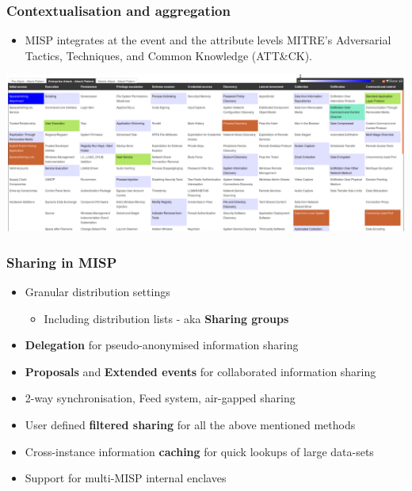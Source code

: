 \begin{frame}
        \frametitle{Contextualisation and aggregation}
        \begin{itemize}
                \item MISP integrates at the event and the attribute levels MITRE's Adversarial Tactics, Techniques, and Common Knowledge (ATT\&CK).
        \end{itemize}
        \includegraphics[scale=0.2]{screenshots/attack-screenshot.png}
\end{frame}

\begin{frame}
\frametitle{Sharing in MISP}
    \begin{itemize}
        \item Granular distribution settings
        \begin{itemize}
            \item Including distribution lists - aka {\bf Sharing groups}
        \end{itemize}
        \item {\bf Delegation} for pseudo-anonymised information sharing
        \item {\bf Proposals} and {\bf Extended events} for collaborated information sharing
        \item 2-way synchronisation, Feed system, air-gapped sharing
        \item User defined {\bf filtered sharing} for all the above mentioned methods
        \item Cross-instance information {\bf caching} for quick lookups of large data-sets
        \item Support for multi-MISP internal enclaves
    \end{itemize}
\end{frame}

